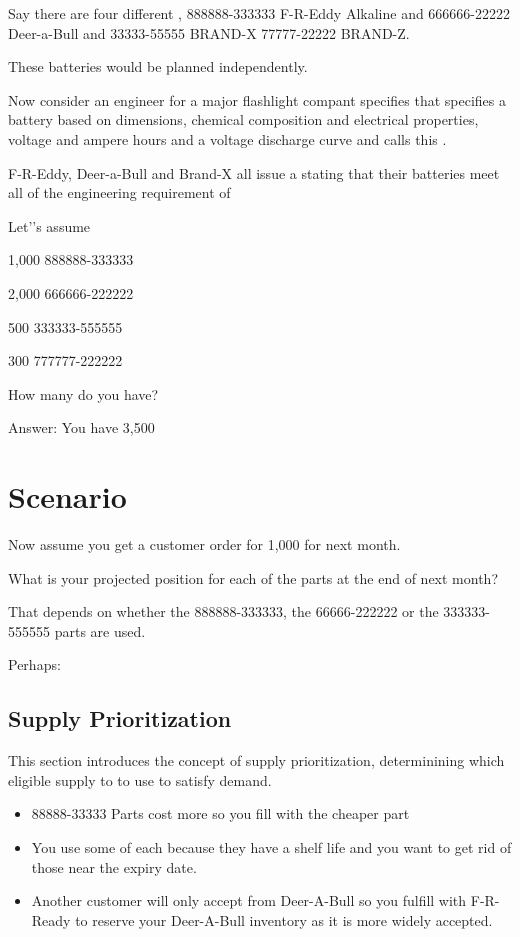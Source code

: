 \documentclass[letterpaper,10pt,english]{sphinxmanual}
\begin{document}
Say there are four different , 888888-333333 F-R-Eddy
Alkaline and 666666-22222 Deer-a-Bull and 33333-55555 BRAND-X
77777-22222 BRAND-Z.

These batteries would be planned independently.

Now consider an engineer for a major flashlight compant specifies that
specifies a battery based on dimensions, chemical composition and
electrical properties, voltage and ampere hours and a voltage discharge
curve and calls this .

F-R-Eddy, Deer-a-Bull and Brand-X all issue a  stating that their batteries meet all of the engineering
requirement of 

Let’’s assume

1,000 888888-333333

2,000 666666-222222

500 333333-555555

300 777777-222222

How many  do you have?

Answer: You have 3,500


\chapter{Scenario}
\label{\detokenize{BusinessProcessReengineering:scenario}}
Now assume you get a customer order for 1,000  for next
month.

What is your projected position for each of the parts at the end of next
month?

That depends on whether the 888888-333333, the 66666-222222 or the
333333-555555 parts are used.

Perhaps:


\section{Supply Prioritization}
\label{\detokenize{BusinessProcessReengineering:supply-prioritization}}
This section introduces the concept of supply prioritization,
determinining which eligible supply to to use to satisfy demand.
\begin{itemize}
\item {} 
88888-33333 Parts cost more so you fill with the cheaper part

\item {} 
You use some of each because they have a shelf life and you want to
get rid of those near the expiry date.

\item {} 
Another customer will only accept from Deer-A-Bull so you fulfill
with F-R-Ready to reserve your Deer-A-Bull inventory as it is more
widely accepted.

\end{itemize}
\end{document}
